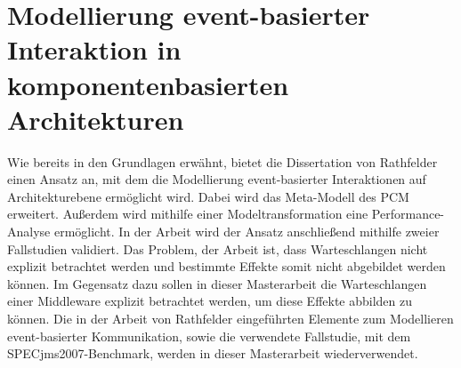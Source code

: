\section{Modellierung event-basierter Interaktion in komponentenbasierten Architekturen}
Wie bereits in den Grundlagen erwähnt, bietet die Dissertation von Rathfelder \cite{Rathfelder2013} einen Ansatz an, mit dem die Modellierung event-basierter Interaktionen auf Architekturebene ermöglicht wird. Dabei wird das Meta-Modell des PCM erweitert. Außerdem wird mithilfe einer Modeltransformation eine Performance-Analyse ermöglicht. In der Arbeit wird der Ansatz anschließend mithilfe zweier Fallstudien validiert. Das Problem, der Arbeit ist, dass Warteschlangen nicht explizit betrachtet werden und bestimmte Effekte somit nicht abgebildet werden können. Im Gegensatz dazu sollen in dieser Masterarbeit die Warteschlangen einer Middleware explizit betrachtet werden, um diese Effekte abbilden zu können. Die in der Arbeit von Rathfelder eingeführten Elemente zum Modellieren event-basierter Kommunikation, sowie die verwendete Fallstudie, mit dem SPECjms2007-Benchmark, werden in dieser Masterarbeit wiederverwendet.
